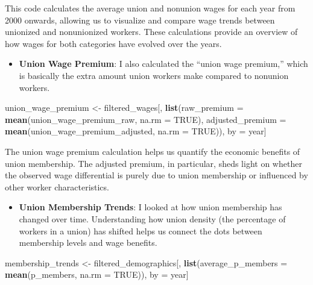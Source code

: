 \documentclass[
]{book}
\newenvironment{Shaded}{\begin{snugshade}}{\end{snugshade}}
\newcommand{\AttributeTok}[1]{\textcolor[rgb]{0.13,0.29,0.53}{#1}}
\newcommand{\ConstantTok}[1]{\textcolor[rgb]{0.56,0.35,0.01}{#1}}
\newcommand{\FunctionTok}[1]{\textcolor[rgb]{0.13,0.29,0.53}{\textbf{#1}}}
\newcommand{\NormalTok}[1]{#1}
\newcommand{\OtherTok}[1]{\textcolor[rgb]{0.56,0.35,0.01}{#1}}
\providecommand{\tightlist}{%
  \setlength{\itemsep}{0pt}\setlength{\parskip}{0pt}}
\theoremstyle{definition}
\theoremstyle{definition}
\theoremstyle{definition}
\theoremstyle{definition}
\theoremstyle{remark}
\begin{document}
This code calculates the average union and nonunion wages for each year from 2000 onwards, allowing us to visualize and compare wage trends between unionized and nonunionized workers. These calculations provide an overview of how wages for both categories have evolved over the years.

\begin{itemize}
\tightlist
\item
  \textbf{Union Wage Premium}: I also calculated the ``union wage premium,'' which is basically the extra amount union workers make compared to nonunion workers.
\end{itemize}

\begin{Shaded}
\begin{Highlighting}[]
\NormalTok{union\_wage\_premium }\OtherTok{\textless{}{-}}\NormalTok{ filtered\_wages[, }
      \FunctionTok{list}\NormalTok{(}\AttributeTok{raw\_premium =} \FunctionTok{mean}\NormalTok{(union\_wage\_premium\_raw, }\AttributeTok{na.rm =} \ConstantTok{TRUE}\NormalTok{),}
      \AttributeTok{adjusted\_premium =} \FunctionTok{mean}\NormalTok{(union\_wage\_premium\_adjusted, }
                              \AttributeTok{na.rm =} \ConstantTok{TRUE}\NormalTok{)), by }\OtherTok{=}\NormalTok{ year]}
\end{Highlighting}
\end{Shaded}

The union wage premium calculation helps us quantify the economic benefits of union membership. The adjusted premium, in particular, sheds light on whether the observed wage differential is purely due to union membership or influenced by other worker characteristics.

\begin{itemize}
\tightlist
\item
  \textbf{Union Membership Trends}: I looked at how union membership has changed over time. Understanding how union density (the percentage of workers in a union) has shifted helps us connect the dots between membership levels and wage benefits.
\end{itemize}

\begin{Shaded}
\begin{Highlighting}[]
\NormalTok{membership\_trends }\OtherTok{\textless{}{-}}\NormalTok{ filtered\_demographics[, }
        \FunctionTok{list}\NormalTok{(}\AttributeTok{average\_p\_members =} \FunctionTok{mean}\NormalTok{(p\_members, }\AttributeTok{na.rm =} \ConstantTok{TRUE}\NormalTok{)), by }\OtherTok{=}\NormalTok{ year]}
\end{Highlighting}
\end{Shaded}
\end{document}
